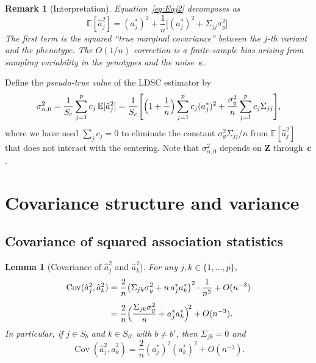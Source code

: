\documentclass[11pt]{article}
\newcommand{\E}{\mathbb{E}}
\newcommand{\Cov}{\operatorname{Cov}}
\newcommand{\Z}{\bm{Z}}
\newcommand{\beps}{\bm{\varepsilon}}
\newcommand{\bc}{\bm{c}}
\newtheorem{lemma}[theorem]{Lemma}
\newtheorem{remark}[theorem]{Remark}
\begin{document}
\begin{remark}[Interpretation]\label{rem:interpretation}
Equation~\eqref{eq:Eaj2} decomposes as
\[
  \E[\hat{a}_j^{2}]
  = (a_j^{*})^{2}
    + \frac{1}{n}\bigl[(a_j^{*})^{2}+\Sigma_{jj}\sigma_y^{2}\bigr].
\]
The first term is the squared ``true marginal covariance'' between the $j$-th
variant and the phenotype.  The $O(1/n)$ correction is a finite-sample bias
arising from sampling variability in the genotypes and the noise~$\beps$.
\end{remark}

\medskip

Define the \emph{pseudo-true value} of the LDSC estimator by
\begin{equation}\label{eq:sigma0}
  \sigma_{\alpha,0}^{2}
  = \frac{1}{S_c}\sum_{j=1}^{p}c_j\,\E[\hat{a}_j^{2}]
  = \frac{1}{S_c}\Biggl[
      \Bigl(1+\frac{1}{n}\Bigr)\sum_{j=1}^{p}c_j(a_j^{*})^{2}
      + \frac{\sigma_y^{2}}{n}\sum_{j=1}^{p}c_j\Sigma_{jj}
    \Biggr],
\end{equation}
where we have used $\sum_{j}c_j=0$ to eliminate the constant
$\sigma_y^{2}\Sigma_{jj}/n$ from $\E[\hat{a}_j^2]$ that does not interact with
the centering.  Note that $\sigma_{\alpha,0}^{2}$ depends on $\Z$ through~$\bc$.

\section{Covariance structure and variance}\label{sec:variance}

\subsection{Covariance of squared association statistics}

\begin{lemma}[Covariance of $\hat{a}_j^{2}$ and
$\hat{a}_k^{2}$]\label{lem:cov}
For any $j,k\in\{1,\dots,p\}$,
\begin{align}
  \Cov(\hat{a}_j^{2},\hat{a}_k^{2})
  &= \frac{2}{n}\bigl(\Sigma_{jk}\sigma_y^{2}+n\,a_j^{*}a_k^{*}\bigr)^{2}
     \cdot\frac{1}{n^{2}}
     + O(n^{-3})
  \notag\\[4pt]
  &= \frac{2}{n}\Bigl(\frac{\Sigma_{jk}\sigma_y^{2}}{n}+a_j^{*}a_k^{*}\Bigr)^{\!2}
     + O(n^{-3}).
  \label{eq:cov_leading}
\end{align}
In particular, if $j\in S_b$ and $k\in S_{b'}$ with $b\ne b'$, then
$\Sigma_{jk}=0$ and
\begin{equation}\label{eq:cov_cross}
  \Cov(\hat{a}_j^{2},\hat{a}_k^{2})
  = \frac{2}{n}(a_j^{*})^{2}(a_k^{*})^{2}+O(n^{-3}).
\end{equation}
\end{lemma}
\end{document}
